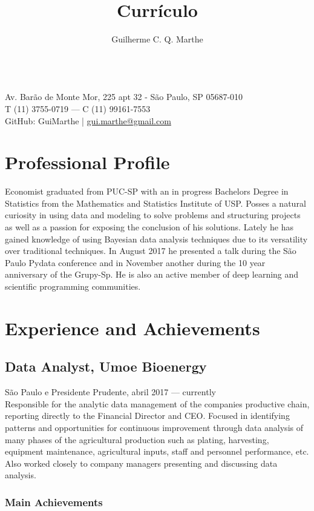 \documentclass{article}
\author{Guilherme C. Q. Marthe}
\title{Currículo}
\makeatletter
\renewcommand{\maketitle}{
\begin{flushleft}
	{\huge\theauthor}
	\vspace{0.2em}\\
	Av. Barão de Monte Mor, 225 apt 32 - São Paulo, SP 05687-010\\
	T (11) 3755-0719 --- C (11) 99161-7553\\
	GitHub: GuiMarthe | \href{mailto:gui.marthe@gmail.com}{gui.marthe@gmail.com}
\end{flushleft}
}
\newcommand{\jobdate}[3]{
\large
\vspace{0.05em} 
  {#1, #2 --- #3}
\vspace{0.5em} 
\\
}
\makeatother
\begin{document}
\maketitle

\section{Professional Profile}

 \linespread{.99}\large{Economist graduated from PUC-SP with an in progress Bachelors Degree in Statistics from the Mathematics and Statistics Institute of USP. Posses a natural curiosity in using data and modeling to solve problems and structuring projects as well as a passion for exposing the conclusion of his solutions. Lately he has gained knowledge of using Bayesian data analysis techniques due to its versatility over traditional techniques. In August 2017 he presented a talk during the São Paulo Pydata conference and in November another during the 10 year anniversary of the Grupy-Sp. He is also an active member of deep learning and scientific programming communities.}

\section{Experience and Achievements}

\subsection{Data Analyst, Umoe Bioenergy}
\jobdate{São Paulo e Presidente Prudente}{abril 2017}{currently}
Responsible for the analytic data management of the companies productive chain, reporting directly to the Financial Director and CEO. Focused in identifying patterns and opportunities for continuous improvement through data analysis of many phases of the agricultural production such as plating, harvesting, equipment maintenance, agricultural inputs, staff and personnel performance, etc. Also worked closely to company managers presenting and discussing data analysis.


\subsubsection{Main Achievements}
\end{document}

